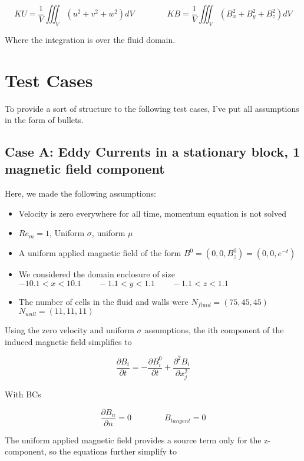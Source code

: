 \documentclass[11pt]{article}
\begin{document}
\begin{equation}
	KU = \frac{1}{V} \iiint_{V} (u^2+v^2+w^2) dV
	\qquad \qquad
	KB = \frac{1}{V} \iiint_{V} (B_x^2+B_y^2+B_z^2) dV
\end{equation}

Where the integration is over the fluid domain.

\section{Test Cases}
To provide a sort of structure to the following test cases, I've put all assumptions in the form of bullets.

\subsection{Case A: Eddy Currents in a stationary block, 1 magnetic field component}
Here, we made the following assumptions:

\begin{itemize}
\item Velocity is zero everywhere for all time, momentum equation is not solved
\item $Re_m = 1$, Uniform $\sigma$, uniform $\mu$
\item A uniform applied magnetic field of the form $B^0 = (0,0,B_z^0) = (0,0,e^{-t})$
\item We considered the domain enclosure of size $-10.1 < x < 10.1 \qquad -1.1 < y < 1.1 \qquad -1.1 < z < 1.1$
\item The number of cells in the fluid and walls were $N_{fluid} = (75,45,45)$ \qquad $N_{wall} = (11,11,11)$
\end{itemize}

Using the zero velocity and uniform $\sigma$ assumptions, the ith component of the induced magnetic field simplifies to

\begin{equation}
	\frac{\partial B_i}{\partial t} 
	=
	-
	\frac{\partial B_i^0}{\partial t}
	+
	\frac{\partial^2 B_i}{\partial x_j^2} 
\end{equation}

With BCs

\begin{equation}
	\frac{\partial B_{n}}{\partial n} = 0
	\qquad \qquad
	B_{tangent} = 0
\end{equation}

The uniform applied magnetic field provides a source term only for the z-component, so the equations further simplify to
\end{document}
